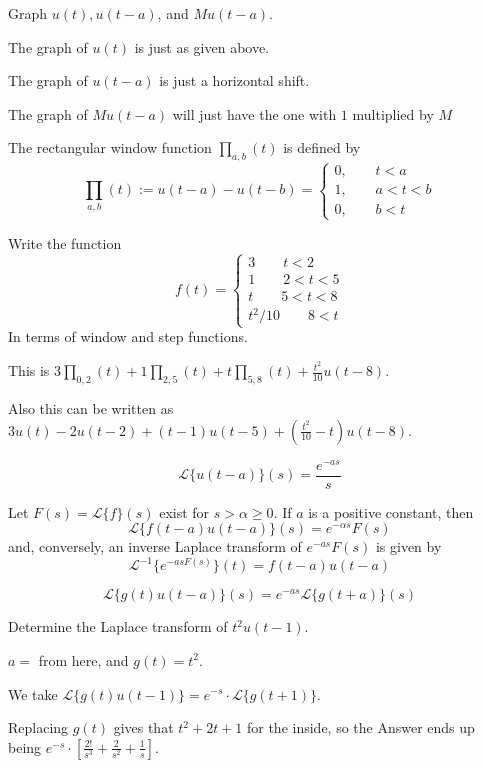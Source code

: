\documentclass[../diffeq.tex]{subfiles}
\begin{document}
\begin{example}
    Graph $u(t), u(t-a)$, and $Mu(t-a)$.
    
    The graph of $u(t)$ is just as given above.

    The graph of $u(t-a)$ is just a horizontal shift.

    The graph of $Mu(t-a)$ will just have the one with $1$ multiplied by $M$
\end{example}

\begin{definition}
    The rectangular window function $\prod_{a,b}(t)$ is defined by 
    \[ \prod_{a,b}(t) := u(t-a)-u(t-b) = \begin{cases}
        0, \qquad t<a \\
        1, \qquad a<t<b \\
        0, \qquad b<t 
    \end{cases}
    \]
\end{definition}

\begin{example}
    Write the function 
    \[ f(t) = \begin{cases}
        3 \qquad t<2 \\
        1 \qquad 2<t<5 \\
        t \qquad 5<t<8 \\
        t^2/10 \qquad 8<t 
    \end{cases}\]
    In terms of window and step functions.

    This is $3\prod_{0,2}(t)+1\prod_{2,5}(t)+t\prod_{5,8}(t)+\frac{t^2}{10}u(t-8)$.

    Also this can be written as $3u(t)-2u(t-2)+(t-1)u(t-5)+(\frac{t^2}{10}-t)u(t-8)$.
\end{example}

\[\mathcal{L}\{u(t-a)\}(s)=\frac{e^{-as}}{s} \]

\begin{theorem}
    Let $F(s)=\mathcal{L}\{f\}(s)$ exist for $s>\alpha\geq 0$. If $a$ is a positive constant, then 
    \[ \mathcal{L}\{f(t-a)u(t-a)\}(s)=e^{-\alpha s}F(s)\]
    and, conversely, an inverse Laplace transform of $e^{-as}F(s)$ is given by 
    \[ \mathcal{L}^{-1}\{e^{-asF(s)}\}(t)=f(t-a)u(t-a) \]
\end{theorem}

\[\mathcal{L}\{g(t)u(t-a)\}(s)=e^{-as}\mathcal{L}\{g(t+a)\}(s)\]

\begin{example}
    Determine the Laplace transform of $t^2u(t-1)$.

    $a=$ from here, and $g(t)=t^2$.

    We take $\mathcal{L}\{g(t)u(t-1)\} = e^{-s}\cdot \mathcal{L}\{g(t+1)\}$.

    Replacing $g(t)$ gives that $t^2+2t+1$ for the inside, so the Answer ends up being $e^{-s}\cdot [\frac{2!}{s^3}+\frac{2}{s^2}+\frac{1}{s}]$.
\end{example}
\end{document}
